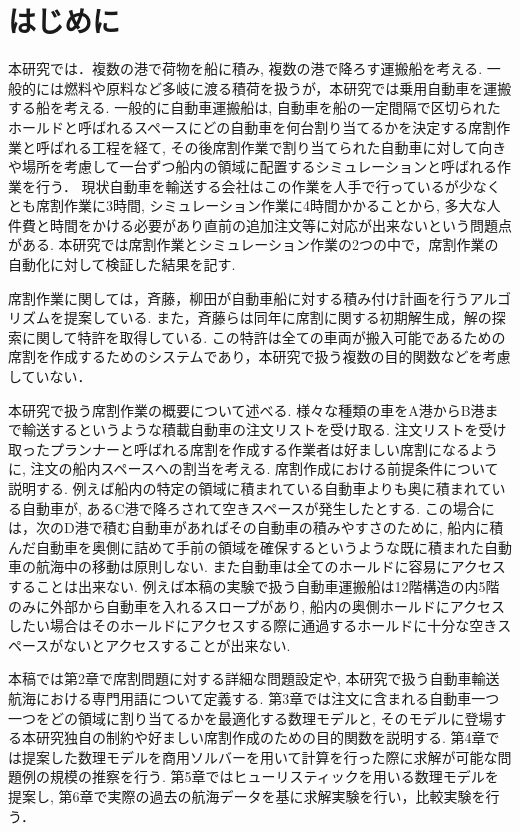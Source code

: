 \chapter{はじめに}
本研究では．複数の港で荷物を船に積み, 複数の港で降ろす運搬船を考える. 一般的には燃料や原料など多岐に渡る積荷を扱うが，本研究では乗用自動車を運搬する船を考える. 一般的に自動車運搬船は, 自動車を船の一定間隔で区切られたホールドと呼ばれるスペースにどの自動車を何台割り当てるかを決定する席割作業と呼ばれる工程を経て, その後席割作業で割り当てられた自動車に対して向きや場所を考慮して一台ずつ船内の領域に配置するシミュレーションと呼ばれる作業を行う． 現状自動車を輸送する会社はこの作業を人手で行っているが少なくとも席割作業に3時間, シミュレーション作業に4時間かかることから, 多大な人件費と時間をかける必要があり直前の追加注文等に対応が出来ないという問題点がある\cite{mitsui}. 本研究では席割作業とシミュレーション作業の2つの中で，席割作業の自動化に対して検証した結果を記す.

席割作業に関しては，斉藤，柳田\cite{saito}が自動車船に対する積み付け計画を行うアルゴリズムを提案している. また，斉藤らは同年に席割に関する初期解生成，解の探索に関して特許を取得している\cite{tokkyo}.
この特許は全ての車両が搬入可能であるための席割を作成するためのシステムであり，本研究で扱う複数の目的関数などを考慮していない．

本研究で扱う席割作業の概要について述べる. 様々な種類の車をA港からB港まで輸送するというような積載自動車の注文リストを受け取る. 注文リストを受け取ったプランナーと呼ばれる席割を作成する作業者は好ましい席割になるように, 注文の船内スペースへの割当を考える. 席割作成における前提条件について説明する. 例えば船内の特定の領域に積まれている自動車よりも奥に積まれている自動車が, あるC港で降ろされて空きスペースが発生したとする. この場合には，次のD港で積む自動車があればその自動車の積みやすさのために, 船内に積んだ自動車を奥側に詰めて手前の領域を確保するというような既に積まれた自動車の航海中の移動は原則しない. また自動車は全てのホールドに容易にアクセスすることは出来ない. 例えば本稿の実験で扱う自動車運搬船は12階構造の内5階のみに外部から自動車を入れるスロープがあり, 船内の奥側ホールドにアクセスしたい場合はそのホールドにアクセスする際に通過するホールドに十分な空きスペースがないとアクセスすることが出来ない.

本稿では第2章で席割問題に対する詳細な問題設定や, 本研究で扱う自動車輸送航海における専門用語について定義する.  第3章では注文に含まれる自動車一つ一つをどの領域に割り当てるかを最適化する数理モデルと, そのモデルに登場する本研究独自の制約や好ましい席割作成のための目的関数を説明する. 第4章では提案した数理モデルを商用ソルバーを用いて計算を行った際に求解が可能な問題例の規模の推察を行う. 
第5章ではヒューリスティックを用いる数理モデルを提案し, 第6章で実際の過去の航海データを基に求解実験を行い，比較実験を行う．
